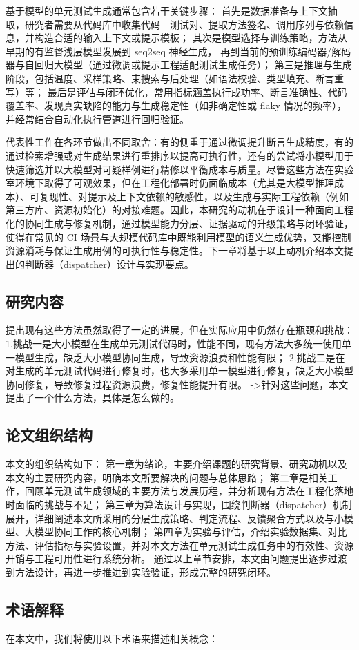 基于模型的单元测试生成通常包含若干关键步骤：
首先是数据准备与上下文抽取，研究者需要从代码库中收集代码—测试对、提取方法签名、调用序列与依赖信息，并构造合适的输入上下文或提示模板；
其次是模型选择与训练策略，方法从早期的有监督浅层模型发展到 seq2seq 神经生成，
再到当前的预训练编码器/解码器与自回归大模型（通过微调或提示工程适配测试生成任务）；
第三是推理与生成阶段，包括温度、采样策略、束搜索与后处理（如语法校验、类型填充、断言重写）等；
最后是评估与闭环优化，常用指标涵盖执行成功率、断言准确性、代码覆盖率、发现真实缺陷的能力与生成稳定性（如非确定性或 flaky 情况的频率），
并经常结合自动化执行管道进行回归验证。

代表性工作在各环节做出不同取舍：有的侧重于通过微调提升断言生成精度，有的通过检索增强或对生成结果进行重排序以提高可执行性，还有的尝试将小模型用于快速筛选并以大模型对可疑样例进行精修以平衡成本与质量。尽管这些方法在实验室环境下取得了可观效果，但在工程化部署时仍面临成本（尤其是大模型推理成本）、可复现性、对提示及上下文依赖的敏感性，以及生成与实际工程依赖（例如第三方库、资源初始化）的对接难题。因此，本研究的动机在于设计一种面向工程化的协同生成与修复机制，通过模型能力分层、证据驱动的升级策略与闭环验证，使得在常见的 CI 场景与大规模代码库中既能利用模型的语义生成优势，又能控制资源消耗与保证生成用例的可执行性与稳定性。下一章将基于以上动机介绍本文提出的判断器（dispatcher）设计与实现要点。


\subsection{研究内容}
提出现有这些方法虽然取得了一定的进展，但在实际应用中仍然存在瓶颈和挑战：
1.挑战一是大小模型在生成单元测试代码时，性能不同，现有方法大多统一使用单一模型生成，缺乏大小模型协同生成，导致资源浪费和性能有限；
2.挑战二是在对生成的单元测试代码进行修复时，也大多采用单一模型进行修复，缺乏大小模型协同修复，导致修复过程资源浪费，修复性能提升有限。
->针对这些问题，本文提出了一个什么方法，具体是怎么做的。

\subsection{论文组织结构}
本文的组织结构如下：
第一章为绪论，主要介绍课题的研究背景、研究动机以及本文的主要研究内容，明确本文所要解决的问题与总体思路；
第二章是相关工作，回顾单元测试生成领域的主要方法与发展历程，并分析现有方法在工程化落地时面临的挑战与不足；
第三章为算法设计与实现，围绕判断器（dispatcher）机制展开，详细阐述本文所采用的分层生成策略、判定流程、反馈聚合方式以及与小模型、大模型协同工作的核心机制；
第四章为实验与评估，介绍实验数据集、对比方法、评估指标与实验设置，并对本文方法在单元测试生成任务中的有效性、资源开销与工程可用性进行系统分析。
通过以上章节安排，本文由问题提出逐步过渡到方法设计，再进一步推进到实验验证，形成完整的研究闭环。


\subsection{术语解释}
在本文中，我们将使用以下术语来描述相关概念：



